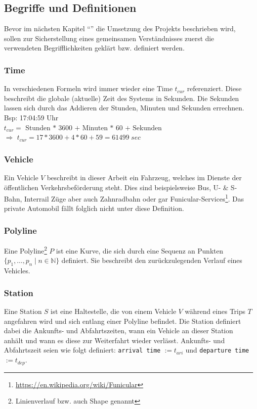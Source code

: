 \subsection{Begriffe und Definitionen}
\label{sub:begriffe}
  Bevor im nächsten Kapitel "`"' die Umsetzung des Projekts beschrieben wird, sollen zur Sicherstellung eines gemeinsamen Verständnisses zuerst die verwendeten Begrifflichkeiten geklärt bzw. definiert werden.

  \subsubsection{Time}
  \label{ssub:time}
    In verschiedenen Formeln wird immer wieder eine Time $t_{cur}$ referenziert. Diese beschreibt die globale (aktuelle) Zeit des Systems in Sekunden. 
    Die Sekunden lassen sich durch das Addieren der Stunden, Minuten und Sekunden errechnen.\\

    Bsp: 17:04:59 Uhr\\

    $t_{cur} = $ Stunden $*$ 3600 $+$ Minuten $*$ 60 $+$ Sekunden\\
    $\Rightarrow$ $t_{cur} = 17 * 3600 + 4 * 60 + 59 = 61499 \; sec$
    

  \subsubsection{Vehicle}
  \label{ssub:vehicle}
    Ein Vehicle $V$ beschreibt in dieser Arbeit ein Fahrzeug, welches im Dienste der öffentlichen Verkehrsbeförderung steht. Dies sind beispielsweise Bus, U- \& S-Bahn, Interrail Züge aber auch Zahnradbahn oder gar Funicular-Services\footnote{\url{https://en.wikipedia.org/wiki/Funicular}}. Das private Automobil fällt folglich nicht unter diese Definition.

  \subsubsection{Polyline}
  \label{ssub:polyline}
    Eine Polyline\footnote{Linienverlauf bzw. auch Shape genannt} $P$ ist eine Kurve, die sich durch eine Sequenz an Punkten $\{ p_1, \dotsc, p_n \;|\; n \in \mathbb{N} \}$ definiert. Sie beschreibt den zurückzulegenden Verlauf eines Vehicles.

  \subsubsection{Station}
  \label{ssub:station}
    Eine Station $S$ ist eine Haltestelle, die von einem Vehicle $V$ während eines Trips $T$ angefahren wird und sich entlang einer Polyline befindet. Die Station definiert dabei die Ankunfts- und Abfahrtszeiten, wann ein Vehicle an dieser Station anhält und wann es diese zur Weiterfahrt wieder verlässt. Ankunfts- und Abfahrtszeit seien wie folgt definiert: \texttt{arrival time} $ := t_{ari}$ und \texttt{departure time} $ := t_{dep}$.

